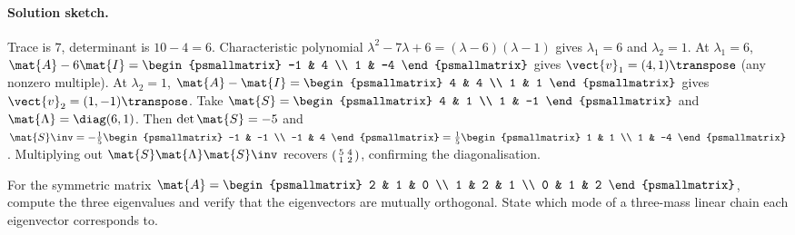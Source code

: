 \paragraph{Solution sketch.}
Trace is $7$, determinant is $10 - 4 = 6$. Characteristic polynomial
$\lambda^{2} - 7\lambda + 6 = (\lambda - 6)(\lambda - 1)$ gives
$\lambda_{1} = 6$ and $\lambda_{2} = 1$. At $\lambda_{1} = 6$,
$\mat{A} - 6\mat{I} = \begin{psmallmatrix} -1 & 4 \\ 1 & -4
\end{psmallmatrix}$ gives $\vect{v}_{1} = (4, 1)\transpose$ (any
nonzero multiple). At $\lambda_{2} = 1$, $\mat{A} - \mat{I} =
\begin{psmallmatrix} 4 & 4 \\ 1 & 1 \end{psmallmatrix}$ gives
$\vect{v}_{2} = (1, -1)\transpose$. Take $\mat{S} = \begin{psmallmatrix}
4 & 1 \\ 1 & -1 \end{psmallmatrix}$ and $\mat{\Lambda} = \diag(6, 1)$.
Then $\det \mat{S} = -5$ and $\mat{S}\inv = -\tfrac{1}{5}
\begin{psmallmatrix} -1 & -1 \\ -1 & 4 \end{psmallmatrix} =
\tfrac{1}{5}\begin{psmallmatrix} 1 & 1 \\ 1 & -4 \end{psmallmatrix}$.
Multiplying out $\mat{S} \mat{\Lambda} \mat{S}\inv$ recovers
$\begin{psmallmatrix} 5 & 4 \\ 1 & 2 \end{psmallmatrix}$, confirming
the diagonalisation.

\begin{exercise}
For the symmetric matrix $\mat{A} =
\begin{psmallmatrix} 2 & 1 & 0 \\ 1 & 2 & 1 \\ 0 & 1 & 2
\end{psmallmatrix}$, compute the three eigenvalues and verify that
the eigenvectors are mutually orthogonal. State which mode of a
three-mass linear chain each eigenvector corresponds to.
\end{exercise}

